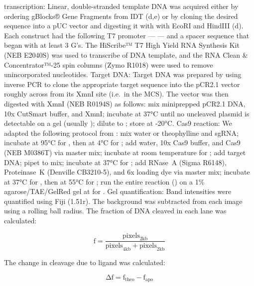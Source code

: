 \documentclass[10pt,oneside]{article}
\begin{document}
\Invitro{} transcription: Linear, double-stranded template DNA was acquired either by ordering gBlocks® Gene Fragments from IDT (d,e) or by cloning the desired sequence into a pUC vector and digesting it with with EcoRI and HindIII (d).  Each construct had the following T7 promoter ---  --- and a spacer sequence that began with at least 3 G's.  The HiScribe™ T7 High Yield RNA Synthesis Kit (NEB E2040S) was used to transcribe  of DNA template, and the RNA Clean \& Con\-cen\-trator™-25 spin columns (Zymo R1018) were used to remove unincorporated nucleotides.  Target DNA: Target DNA was prepared by using inverse PCR to clone the appropriate target sequence into the pCR2.1 vector roughly across from its XmnI site (i.e.\ in the MCS).  The vector was then digested with XmnI (NEB R0194S) as follows: mix   miniprepped pCR2.1 DNA,  10x CutSmart buffer, and   XmnI; incubate at 37°C until no uncleaved plasmid is detectable on a gel (usually ); dilute to ; store at -20°C.  Cas9 reaction: We adapted the following protocol from : mix  water or  theophylline and   sgRNA; incubate at 95°C for , then at 4°C for ; add  water,  10x Cas9 buffer, and   Cas9 (NEB M0386T) via master mix; incubate at room temperature for ; add   target DNA; pipet to mix; incubate at 37°C for ; add   RNase~A (Sigma R6148),   Proteinase~K (Denville CB3210-5), and  6x loading dye via master mix; incubate at 37°C for , then at 55°C for ; run the entire reaction () on a 1\% agarose/TAE/GelRed gel at  for .  Gel quantification: Band intensities were quantified using Fiji (1.51r).  The background was subtracted from each image using a  rolling ball radius.  The fraction of DNA cleaved in each lane was calculated:

\begin{displaymath}
 \mathrm{f} = \frac{\mathrm{pixels}_\mathrm{2kb}}{\mathrm{pixels}_\mathrm{4kb} + \mathrm{pixels}_\mathrm{2kb}}
\end{displaymath}

The change in cleavage due to ligand was calculated: 

\begin{displaymath}
 \mathrm{Δf} = \mathrm{f}_\mathrm{theo} - \mathrm{f}_\mathrm{apo}
\end{displaymath}
\end{document}
